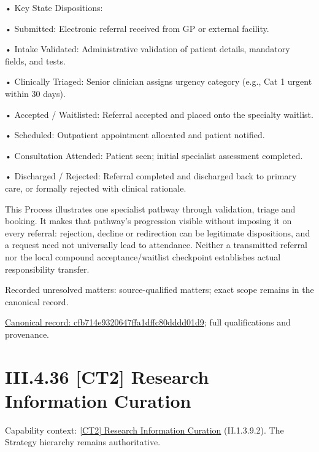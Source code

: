 •
Key State Dispositions:



•
Submitted: Electronic referral received from GP or external facility.



•
Intake Validated: Administrative validation of patient details, mandatory fields, and tests.



•
Clinically Triaged: Senior clinician assigns urgency category (e.g., Cat 1 urgent within 30 days).



•
Accepted / Waitlisted: Referral accepted and placed onto the specialty waitlist.



•
Scheduled: Outpatient appointment allocated and patient notified.



•
Consultation Attended: Patient seen; initial specialist assessment completed.



•
Discharged / Rejected: Referral completed and discharged back to primary care, or formally rejected with clinical rationale.



This Process illustrates one specialist pathway through validation, triage and booking. It makes that pathway's progression visible without imposing it on every referral: rejection, decline or redirection can be legitimate dispositions, and a request need not universally lead to attendance. Neither a transmitted referral nor the local compound acceptance/waitlist checkpoint establishes actual responsibility transfer.


{\small Recorded unresolved matters: source-qualified matters; exact scope remains in the canonical record.}\par
{\footnotesize \href{../../../../continuum/business/business-process/cfb714e9320647ffa1dffc80dddd01d9.md}{Canonical record: cfb714e9320647ffa1dffc80dddd01d9}; full qualifications and provenance.}\par
\section*{III.4.36 [CT2] Research Information Curation}
\label{navigation:III.4.36}

{\small Capability context: \hyperref[element:4f5b8cec90324c2989cdc30e80bc8cb9]{[CT2] Research Information Curation} (II.1.3.9.2). The Strategy hierarchy remains authoritative.}\par
